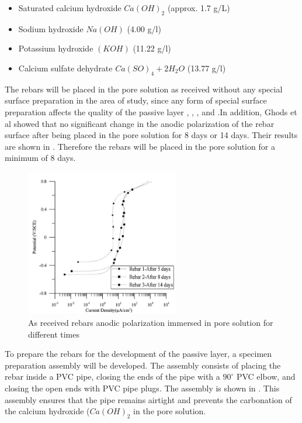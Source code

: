 \begin{itemize}
	\item Saturated calcium hydroxide $Ca(OH)_2$ (approx. 1.7 g/L)
	\item Sodium hydroxide $Na(OH)$ (4.00 g/l)
	\item Potassium hydroxide $(KOH)$ (11.22 g/l)
	\item Calcium sulfate dehydrate $Ca(SO)_4 + 2H_2O$ (13.77 g/l)
\end{itemize}

The rebars will be placed in the pore solution as received without any special surface preparation in the area of study, since any form of special surface preparation affects the quality of the passive layer \cite{Andersson1989}, \cite{DawnMarcotte2001}, \cite{Moragues1987}, and \cite{Page1983}.In addition, Ghods et al showed that no significant change in the anodic polarization of the rebar surface after being placed in the pore solution for 8 days or 14 days. Their results are shown in . Therefore the rebars will be placed in the pore solution for a minimum of 8 days. 

\begin{figure}[htbp]
	\centering
	\includegraphics[width=0.6\textwidth]{Chapter-3/figs/AsReceived_AnodicPolarization_time}
	\caption{As received rebars anodic polarization immersed in pore solution for different times\cite{Ghods2009}}
	\label{fig:GhodsRebarPassivation}
\end{figure}

To prepare the rebars for the development of the passive layer, a specimen preparation assembly will be developed. The assembly consists of placing the rebar inside a PVC pipe, closing the ends of the pipe  with a $90^{\circ}$ PVC elbow, and closing the open ends with PVC pipe plugs. The assembly is shown in . This assembly ensures that the pipe remains airtight and prevents the carbonation of the calcium hydroxide ($Ca(OH)_{2}$ in the pore solution.

